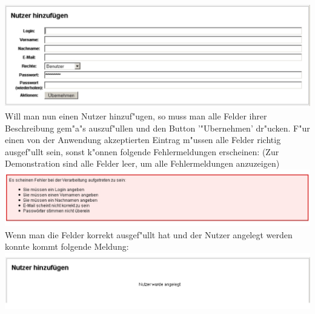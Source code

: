 \includegraphics[scale=0.5]{nutzeranl2}\\
Will man nun einen Nutzer hinzuf"ugen, so muss man alle Felder ihrer Beschreibung gem"a"s auszuf"ullen und den Button '"Ubernehmen' 
dr"ucken. F"ur einen von der Anwendung akzeptierten Eintrag m"ussen alle Felder richtig ausgef"ullt sein, sonst k"onnen folgende Fehlermeldungen 
erscheinen: (Zur Demonstration sind alle Felder leer, um alle Fehlermeldungen anzuzeigen)\\
\includegraphics[scale=0.5]{nutzeranl3}\\
Wenn man die Felder korrekt ausgef"ullt hat und der Nutzer angelegt werden konnte kommt folgende Meldung:\\
\includegraphics[scale=0.5]{nutzeranl4}

